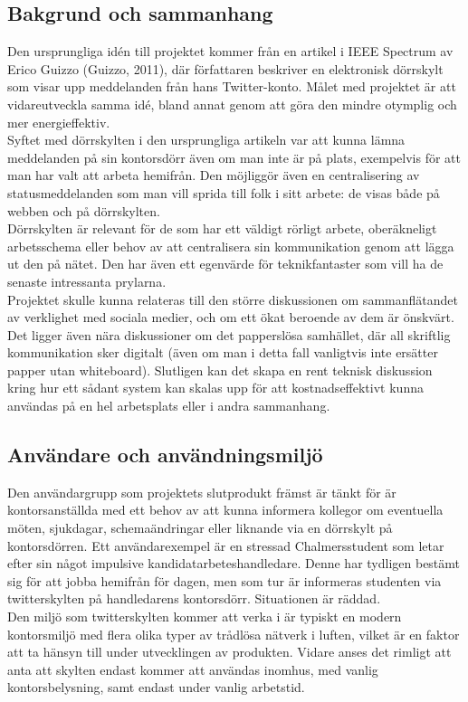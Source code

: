 \documentclass[a4paper,11pt]{article}
\begin{document}
\subsection{Bakgrund och sammanhang}
Den ursprungliga idén till projektet kommer från en artikel i IEEE Spectrum av Erico Guizzo (Guizzo, 2011), där författaren beskriver en elektronisk dörrskylt som visar upp meddelanden från hans Twitter-konto. Målet med projektet är att vidareutveckla samma idé, bland annat genom att göra den mindre otymplig och mer energieffektiv. \\

Syftet med dörrskylten i den ursprungliga artikeln var att kunna lämna meddelanden på sin kontorsdörr även om man inte är på plats, exempelvis för att man har valt att arbeta hemifrån. Den möjliggör även en centralisering av statusmeddelanden som man vill sprida till folk i sitt arbete: de visas både på webben och på dörrskylten. \\

Dörrskylten är relevant för de som har ett väldigt rörligt arbete, oberäkneligt arbetsschema eller behov av att centralisera sin kommunikation genom att lägga ut den på nätet. Den har även ett egenvärde för teknikfantaster som vill ha de senaste intressanta prylarna. \\

Projektet skulle kunna relateras till den större diskussionen om sammanflätandet av verklighet med sociala medier, och om ett ökat beroende av dem är önskvärt. Det ligger även nära diskussioner om det papperslösa samhället, där all skriftlig kommunikation sker digitalt (även om man i detta fall vanligtvis inte ersätter papper utan whiteboard). Slutligen kan det skapa en rent teknisk diskussion kring hur ett sådant system kan skalas upp för att kostnadseffektivt kunna användas på en hel arbetsplats eller i andra sammanhang.

\subsection{Användare och användningsmiljö}
Den användargrupp som projektets slutprodukt främst är tänkt för är kontorsanställda med ett behov av att kunna informera kollegor om eventuella möten, sjukdagar, schemaändringar eller liknande via en dörrskylt på kontorsdörren. Ett användarexempel är en stressad Chalmersstudent som letar efter sin något impulsive kandidatarbeteshandledare. Denne har tydligen bestämt sig för att jobba hemifrån för dagen, men som tur är informeras studenten via twitterskylten på handledarens kontorsdörr. Situationen är räddad. \\
Den miljö som twitterskylten kommer att verka i är typiskt en modern kontorsmiljö med flera olika typer av trådlösa nätverk i luften, vilket är en faktor att ta hänsyn till under utvecklingen av produkten. Vidare anses det rimligt att anta att skylten endast kommer att användas inomhus, med vanlig kontorsbelysning, samt endast under vanlig arbetstid.
\end{document}
